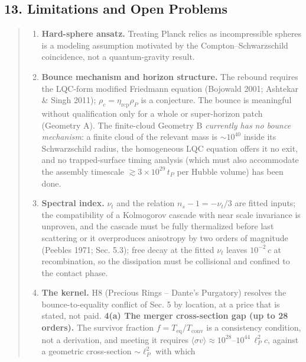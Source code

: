 \documentclass[
  11pt,
]{article}
\providecommand{\tightlist}{%
  \setlength{\itemsep}{0pt}\setlength{\parskip}{0pt}}
\begin{document}
\hypertarget{limitations-and-open-problems}{%
\subsection{\texorpdfstring{\textbf{13. Limitations and Open
Problems}}{13. Limitations and Open Problems}}\label{limitations-and-open-problems}}

\begin{quote}
\begin{enumerate}
\def\labelenumi{\arabic{enumi}.}
\tightlist
\item
  \textbf{Hard-sphere ansatz.} Treating Planck relics as incompressible
  spheres is a modeling assumption motivated by the
  Compton--Schwarzschild coincidence, not a quantum-gravity result.
\item
  \textbf{Bounce mechanism and horizon structure.} The rebound requires
  the LQC-form modified Friedmann equation (Bojowald 2001; Ashtekar \&
  Singh 2011); \(\rho_c = \eta_{\text{rcp}}\rho_P\) is a conjecture. The
  bounce is meaningful without qualification only for a whole or
  super-horizon patch (Geometry A). The finite-cloud Geometry B
  \emph{currently has no bounce mechanism}: a finite cloud of the
  relevant mass is \(\sim\!10^{40}\) inside its Schwarzschild radius,
  the homogeneous LQC equation offers it no exit, and no trapped-surface
  timing analysis (which must also accommodate the assembly timescale
  \(\gtrsim 3\times10^{29}\,t_P\) per Hubble volume) has been done.
\item
  \textbf{Spectral index.} \(\nu_t\) and the relation
  \(n_s - 1 = -\nu_t/3\) are fitted inputs; the compatibility of a
  Kolmogorov cascade with near scale invariance is unproven, and the
  cascade must be fully thermalized before last scattering or it
  overproduces anisotropy by two orders of magnitude (Peebles 1971; Sec.
  5.3); free decay at the fitted \(\nu_t\) leaves \(10^{-2}\,c\) at
  recombination, so the dissipation must be collisional and confined to
  the contact phase.
\item
  \textbf{The kernel.} H8 (Precious Rings -- Dante's Purgatory) resolves
  the bounce-to-equality conflict of Sec. 5 by location, at a price that
  is stated, not paid. \textbf{4(a) The merger cross-section gap (up to
  28 orders).} The survivor fraction
  \(f = T_{\text{eq}}/T_{\text{conv}}\) is a consistency condition, not
  a derivation, and meeting it requires
  \(\langle\sigma v\rangle \approx 10^{28}\)--\(10^{44}\,\ell_P^2 c\),
  against a geometric cross-section \(\sim\!\ell_P^2\) with which

\end{enumerate}
\end{quote}
\end{document}

